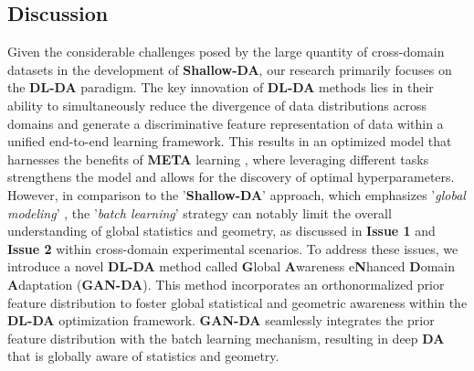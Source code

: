 \subsection{Discussion}
\label{Discussion}


Given the considerable challenges posed by the large quantity of cross-domain datasets in the development of \textbf{Shallow-DA}, our research primarily focuses on the \textbf{DL-DA} paradigm. The key innovation of \textbf{DL-DA} methods lies in their ability to simultaneously reduce the divergence of data distributions across domains and generate a discriminative feature representation of data within a unified end-to-end learning framework. This results in an optimized model that harnesses the benefits of \textbf{META} learning \cite{wei2021metaalign}, where leveraging different tasks strengthens the model and allows for the discovery of optimal hyperparameters. However, in comparison to the '\textbf{Shallow-DA}' approach, which emphasizes '\textit{global modeling}' \cite{belkin2003laplacian}, the '\textit{batch learning}' strategy \cite{goodfellow2016deep} can notably limit the overall understanding of global statistics and geometry, as discussed in \textbf{Issue 1} and \textbf{Issue 2} within cross-domain experimental scenarios. To address these issues, we introduce a novel \textbf{DL-DA} method called \textbf{G}lobal \textbf{A}wareness e\textbf{N}hanced \textbf{D}omain \textbf{A}daptation (\textbf{GAN-DA}). This method incorporates an orthonormalized prior feature distribution to foster global statistical and geometric awareness within the \textbf{DL-DA} optimization framework. \textbf{GAN-DA} seamlessly integrates the prior feature distribution with the batch learning mechanism, resulting in deep \textbf{DA} that is globally aware of statistics and geometry.